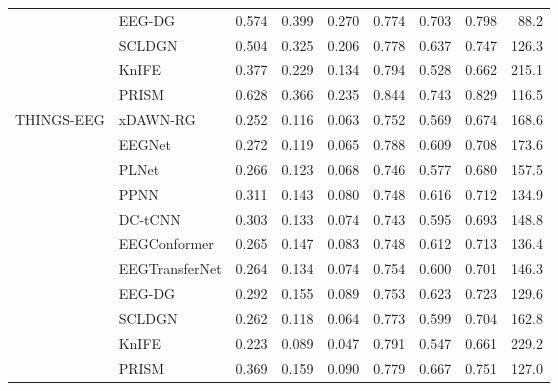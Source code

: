 \begin{table}[H]
\begin{adjustbox}{max width=\textwidth}
\begin{tabular}{@{}llrrrrrrr@{}}
 & EEG-DG & 0.574 & 0.399 & 0.270 & 0.774 & 0.703 & 0.798 & 88.2 \\
 & SCLDGN & 0.504 & 0.325 & 0.206 & 0.778 & 0.637 & 0.747 & 126.3 \\
 & KnIFE & 0.377 & 0.229 & 0.134 & 0.794 & 0.528 & 0.662 & 215.1 \\
 & PRISM & 0.628 & 0.366 & 0.235 & 0.844 & 0.743 & 0.829 & 116.5 \\
\midrule
\multirow{11}{*}{THINGS-EEG} & xDAWN-RG & 0.252 & 0.116 & 0.063 & 0.752 & 0.569 & 0.674 & 168.6 \\
 & EEGNet & 0.272 & 0.119 & 0.065 & 0.788 & 0.609 & 0.708 & 173.6 \\
 & PLNet & 0.266 & 0.123 & 0.068 & 0.746 & 0.577 & 0.680 & 157.5 \\
 & PPNN & 0.311 & 0.143 & 0.080 & 0.748 & 0.616 & 0.712 & 134.9 \\
 & DC-tCNN & 0.303 & 0.133 & 0.074 & 0.743 & 0.595 & 0.693 & 148.8 \\
 & EEGConformer & 0.265 & 0.147 & 0.083 & 0.748 & 0.612 & 0.713 & 136.4 \\
 & EEGTransferNet & 0.264 & 0.134 & 0.074 & 0.754 & 0.600 & 0.701 & 146.3 \\
 & EEG-DG & 0.292 & 0.155 & 0.089 & 0.753 & 0.623 & 0.723 & 129.6 \\
 & SCLDGN & 0.262 & 0.118 & 0.064 & 0.773 & 0.599 & 0.704 & 162.8 \\
 & KnIFE & 0.223 & 0.089 & 0.047 & 0.791 & 0.547 & 0.661 & 229.2 \\
 & PRISM & 0.369 & 0.159 & 0.090 & 0.779 & 0.667 & 0.751 & 127.0 \\
\bottomrule
\end{tabular}
\end{adjustbox}
\end{table}
